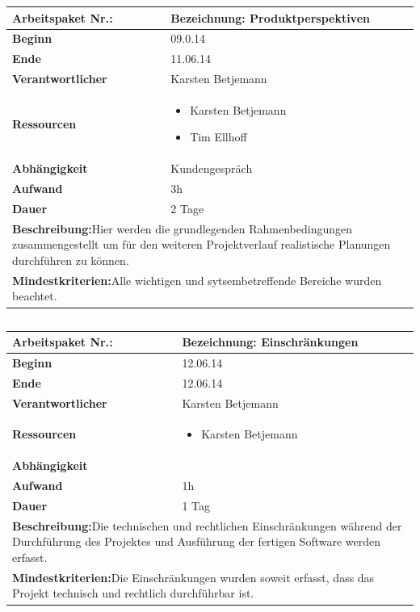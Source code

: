 \documentclass[fontsize=12pt,paper=a4,twoside]{scrartcl}
\begin{document}
	\begin{tabular}{|p{5.3cm}|p{9.7cm}|}\hline
		\textbf{Arbeitspaket Nr.:}  & \textbf{Bezeichnung:} Produktperspektiven\\ \hline \hline
		\textbf{Beginn} & 09.0.14\\ \hline
		\textbf{Ende} & 11.06.14\\ \hline
		\textbf{Verantwortlicher} & Karsten Betjemann\\ \hline
		\textbf{Ressourcen} & \begin{itemize}
			\item Karsten Betjemann
			\item Tim Ellhoff
		\end{itemize}    \\ \hline
		\textbf{Abhängigkeit} & Kundengespräch\\ \hline
		\textbf{Aufwand} & 3h\\ \hline
		\textbf{Dauer} & 2 Tage\\ \hline
		\multicolumn{2}{|p{15cm}|}{\textbf{Beschreibung:}\newline Hier werden die grundlegenden Rahmenbedingungen zusammengestellt um für den weiteren Projektverlauf realistische Planungen durchführen zu können. }\\ \hline
		\multicolumn{2}{|p{15cm}|}{\textbf{Mindestkriterien:}\newline Alle wichtigen und sytsembetreffende Bereiche wurden beachtet. }\\ \hline
	\end{tabular}
	
	\begin{verbatim} 
	\end{verbatim}
	
	
	\begin{tabular}{|p{5.3cm}|p{9.7cm}|}\hline
		\textbf{Arbeitspaket Nr.:}  & \textbf{Bezeichnung:} Einschränkungen\\ \hline \hline
		\textbf{Beginn} & 12.06.14\\ \hline
		\textbf{Ende} & 12.06.14\\ \hline
		\textbf{Verantwortlicher} & Karsten Betjemann\\ \hline
		\textbf{Ressourcen} & \begin{itemize}
			\item Karsten Betjemann
		\end{itemize}    \\ \hline
		\textbf{Abhängigkeit} &\\ \hline
		\textbf{Aufwand} & 1h\\ \hline
		\textbf{Dauer} & 1 Tag\\ \hline
		\multicolumn{2}{|p{15cm}|}{\textbf{Beschreibung:}\newline Die technischen und rechtlichen Einschränkungen während der Durchführung des Projektes und Ausführung der 
			fertigen Software werden erfasst. }\\ \hline
		\multicolumn{2}{|p{15cm}|}{\textbf{Mindestkriterien:}\newline Die Einschränkungen wurden soweit erfasst, dass das Projekt technisch und rechtlich durchführbar ist. }\\ \hline
	\end{tabular}
	
\end{document}
